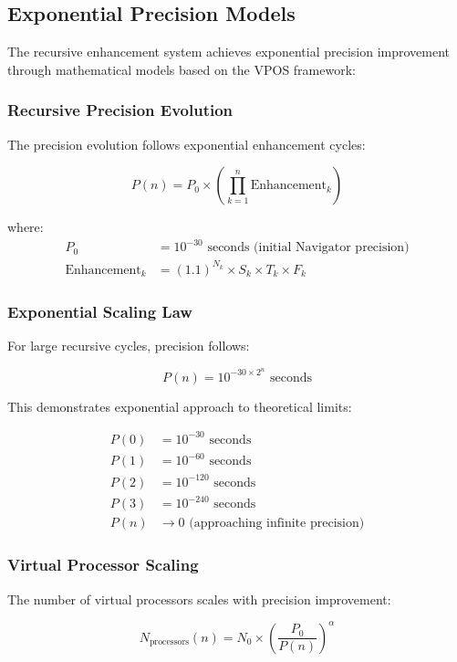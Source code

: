 \documentclass[11pt]{article}
\theoremstyle{remark}
\begin{document}
\subsection{Exponential Precision Models}

The recursive enhancement system achieves exponential precision improvement through mathematical models based on the VPOS framework:

\subsubsection{Recursive Precision Evolution}

The precision evolution follows exponential enhancement cycles:

$$P(n) = P_0 \times \left(\prod_{k=1}^{n} \text{Enhancement}_k\right)$$

where:
\begin{align}
P_0 &= 10^{-30} \text{ seconds (initial Navigator precision)} \\
\text{Enhancement}_k &= (1.1)^{N_k} \times S_k \times T_k \times F_k
\end{align}

\subsubsection{Exponential Scaling Law}

For large recursive cycles, precision follows:

$$P(n) = 10^{-30 \times 2^n} \text{ seconds}$$

This demonstrates exponential approach to theoretical limits:

\begin{align}
P(0) &= 10^{-30} \text{ seconds} \\
P(1) &= 10^{-60} \text{ seconds} \\
P(2) &= 10^{-120} \text{ seconds} \\
P(3) &= 10^{-240} \text{ seconds} \\
P(n) &\rightarrow 0 \text{ (approaching infinite precision)}
\end{align}

\subsubsection{Virtual Processor Scaling}

The number of virtual processors scales with precision improvement:

$$N_{\text{processors}}(n) = N_0 \times \left(\frac{P_0}{P(n)}\right)^{\alpha}$$
\end{document}
